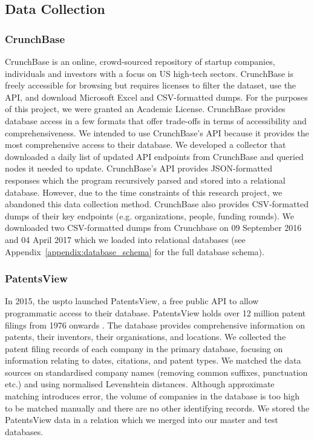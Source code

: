 \documentclass[../thesis/thesis.tex]{subfiles}
\begin{document}
\subsection{Data Collection}

\subsubsection{CrunchBase}

CrunchBase is an online, crowd-sourced repository of startup companies, individuals and investors with a focus on US high-tech sectors. CrunchBase is freely accessible for browsing but requires licenses to filter the dataset, use the API, and download Microsoft Excel and CSV-formatted dumps. For the purposes of this project, we were granted an Academic License. CrunchBase provides database access in a few formats that offer trade-offs in terms of accessibility and comprehensiveness. We intended to use CrunchBase's API because it provides the most comprehensive access to their database. We developed a collector that downloaded a daily list of updated API endpoints from CrunchBase and queried nodes it needed to update. CrunchBase's API provides JSON-formatted responses which the program recursively parsed and stored into a relational database. However, due to the time constraints of this research project, we abandoned this data collection method. CrunchBase also provides CSV-formatted dumps of their key endpoints (e.g. organizations, people, funding rounds). We downloaded two CSV-formatted dumps from Crunchbase on 09 September 2016 and 04 April 2017 which we loaded into relational databases (see Appendix~\ref{appendix:database_schema} for the full database schema).

\subsubsection{PatentsView}

In 2015, the \gls{uspto} launched PatentsView, a free public API to allow programmatic access to their database. PatentsView holds over 12 million patent filings from 1976 onwards \cite{schultz2016}. The database provides comprehensive information on patents, their inventors, their organisations, and locations. We collected the patent filing records of each company in the primary database, focusing on information relating to dates, citations, and patent types. We matched the data sources on standardised company names (removing common suffixes, punctuation etc.) and using normalised Levenshtein distances. Although approximate matching introduces error, the volume of companies in the database is too high to be matched manually and there are no other identifying records. We stored the PatentsView data in a relation which we merged into our master and test databases.
\end{document}
